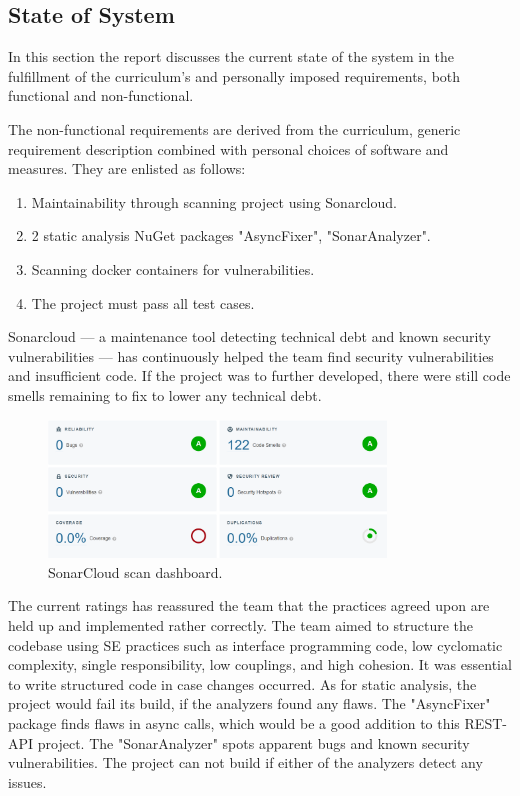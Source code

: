 \subsection{State of System}\label{stateofsystem}

In this section the report discusses the current state of the system in the fulfillment of the curriculum's and personally imposed requirements, both functional and non-functional. 



The non-functional requirements are derived from the curriculum, generic requirement description combined with personal choices of software and measures. They are enlisted as follows:

\begin{enumerate}[noitemsep]
  \item Maintainability through scanning project using Sonarcloud.
  \item 2 static analysis NuGet packages "AsyncFixer", "SonarAnalyzer".
  \item Scanning docker containers for vulnerabilities.
  \item The project must pass all test cases.
\end{enumerate}

Sonarcloud — a maintenance tool detecting technical debt and known security vulnerabilities — has continuously helped the team find security vulnerabilities and insufficient code. If the project was to further developed, there were still code smells remaining to fix to lower any technical debt.

\begin{figure}[h]
    \centering
    \includegraphics[width=0.8\textwidth]{images/sonarscan.PNG}
    \caption{SonarCloud scan dashboard.}
    \label{fig:scanCode}
\end{figure}

The current ratings has reassured the team that the practices agreed upon are held up and implemented rather correctly. The team aimed to structure the codebase using SE practices such as interface programming code, low cyclomatic complexity, single responsibility, low couplings, and high cohesion. It was essential to write structured code in case changes occurred. As for static analysis, the project would fail its build, if the analyzers found any flaws. The "AsyncFixer" package finds flaws in async calls, which would be a good addition to this REST-API project. The "SonarAnalyzer" spots apparent bugs and known security vulnerabilities. The project can not build if either of the analyzers detect any issues. 

